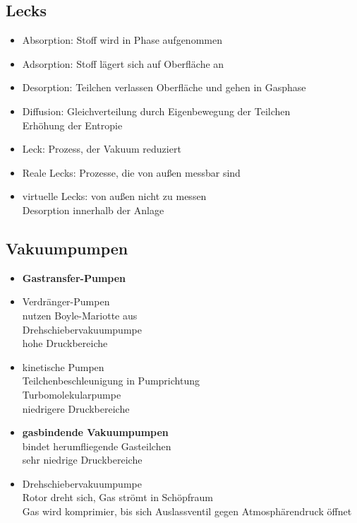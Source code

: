 \subsection{Lecks}
\begin{itemize}
    \item Absorption: Stoff wird in Phase aufgenommen
    \item Adsorption: Stoff lägert sich auf Oberfläche an 
    \item Desorption: Teilchen verlassen Oberfläche und gehen in Gasphase
    \item Diffusion: Gleichverteilung durch Eigenbewegung der Teilchen\\
    \to Erhöhung der Entropie
    \item Leck: Prozess, der Vakuum reduziert
    \item Reale Lecks: Prozesse, die von außen messbar sind 
    \item virtuelle Lecks: von außen nicht zu messen\\
    \to Desorption innerhalb der Anlage
\end{itemize}
\subsection{Vakuumpumpen}
\begin{itemize}
    \item \textbf{Gastransfer-Pumpen}
    \item Verdränger-Pumpen\\
    \to nutzen Boyle-Mariotte aus\\
    \to Drehschiebervakuumpumpe\\
    \to hohe Druckbereiche
    \item kinetische Pumpen\\
    \to Teilchenbeschleunigung in Pumprichtung\\
    \to Turbomolekularpumpe\\
    \to niedrigere Druckbereiche
    \\
    \item \textbf{gasbindende Vakuumpumpen}\\
    \to bindet herumfliegende Gasteilchen\\
    \to sehr niedrige Druckbereiche
    \\
    \item Drehschiebervakuumpumpe\\
    \to Rotor dreht sich, Gas strömt in Schöpfraum\\
    \to Gas wird komprimier, bis sich Auslassventil gegen Atmosphärendruck öffnet
\end{itemize}
